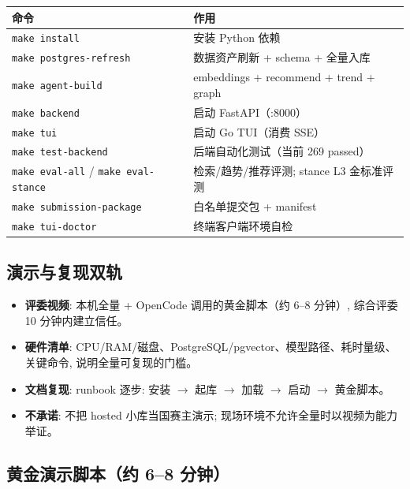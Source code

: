 \begin{center}
\begin{tabularx}{\textwidth}{p{38mm}X}
\toprule
命令 & 作用 \\
\midrule
\texttt{make install} & 安装 Python 依赖 \\
\texttt{make postgres-refresh} & 数据资产刷新 + schema + 全量入库 \\
\texttt{make agent-build} & embeddings + recommend + trend + graph \\
\texttt{make backend} & 启动 FastAPI（:8000） \\
\texttt{make tui} & 启动 Go TUI（消费 SSE） \\
\texttt{make test-backend} & 后端自动化测试（当前 269 passed） \\
\texttt{make eval-all} / \texttt{make eval-stance} & 检索/趋势/推荐评测; stance L3 金标准评测 \\
\texttt{make submission-package} & 白名单提交包 + manifest \\
\texttt{make tui-doctor} & 终端客户端环境自检 \\
\bottomrule
\end{tabularx}
\end{center}

\subsection{演示与复现双轨}

\begin{plainbox}
\begin{itemize}
  \item \textbf{评委视频}: 本机全量 + OpenCode 调用的黄金脚本（约 6--8 分钟）, 综合评委 10 分钟内建立信任。
  \item \textbf{硬件清单}: CPU/RAM/磁盘、PostgreSQL/pgvector、模型路径、耗时量级、关键命令,
        说明全量可复现的门槛。
  \item \textbf{文档复现}: runbook 逐步: 安装 $\rightarrow$ 起库 $\rightarrow$ 加载 $\rightarrow$ 启动 $\rightarrow$ 黄金脚本。
  \item \textbf{不承诺}: 不把 hosted 小库当国赛主演示; 现场环境不允许全量时以视频为能力举证。
\end{itemize}
\end{plainbox}

\subsection{黄金演示脚本（约 6--8 分钟）}

